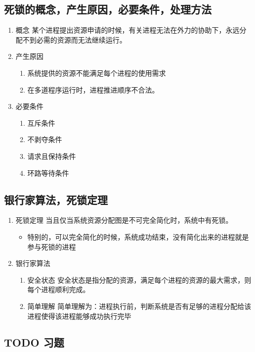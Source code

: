 \documentclass[11pt]{article}
\begin{document}
\subsection{死锁的概念，产生原因，必要条件，处理方法}
\label{sec-2-13}
\begin{enumerate}
\item 概念
\label{sec-2-13-0-1}
某个进程提出资源申请的时候，有关进程无法在外力的协助下，永远分配不到必需的资源而无法继续运行。
\item 产生原因
\label{sec-2-13-0-2}
\begin{enumerate}
\item 系统提供的资源不能满足每个进程的使用需求
\item 在多道程序运行时，进程推进顺序不合法。
\end{enumerate}
\item 必要条件
\label{sec-2-13-0-3}
\begin{enumerate}
\item 互斥条件
\item 不剥夺条件
\item 请求且保持条件
\item 环路等待条件
\end{enumerate}
\end{enumerate}

\subsection{银行家算法，死锁定理}
\label{sec-2-14}
\begin{enumerate}
\item 死锁定理
\label{sec-2-14-0-1}
当且仅当系统资源分配图是不可完全简化时，系统中有死锁。
\begin{itemize}
\item 特别的，可以完全简化的时候，系统成功结束，没有简化出来的进程就是参与死锁的进程
\end{itemize}
\item 银行家算法
\label{sec-2-14-0-2}
\begin{enumerate}
\item 安全状态
\label{sec-2-14-0-2-1}
安全状态是指分配的资源，满足每个进程的资源的最大需求，则每个进程顺利完成。
\item 简单理解
\label{sec-2-14-0-2-2}
简单理解为：进程执行前，判断系统是否有足够的进程分配给该进程使得该进程能够成功执行完毕
\end{enumerate}
\end{enumerate}
\subsection{{\bfseries\sffamily TODO} 习题}
\label{sec-2-15}
\end{document}
